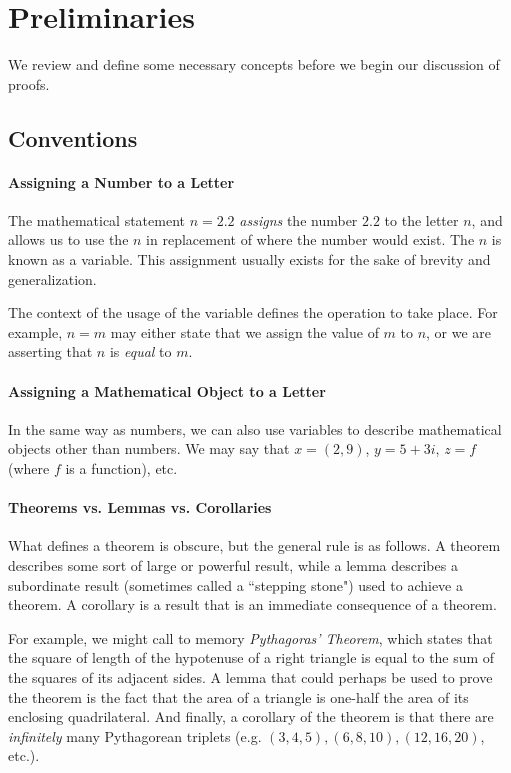 \documentclass[../proofs.tex]{subfiles}
\begin{document}
\chapter{Preliminaries}
We review and define some necessary concepts before we begin our discussion of proofs.
\section{Conventions}
  \subsubsection*{Assigning a Number to a Letter}
  The mathematical statement $n = 2.2$ \emph{assigns} the number $2.2$ to the letter $n$,
  and allows us to use the $n$ in replacement of where the number would exist.
  The $n$ is known as a variable. This assignment usually exists for the sake of
  brevity and generalization.

  The context of the usage of the variable defines the operation to take place.
  For example, $n = m$ may either state that we assign the value of $m$ to $n$, or
  we are asserting that $n$ is \emph{equal} to $m$.

  \subsubsection{Assigning a Mathematical Object to a Letter}
  In the same way as numbers, we can also use variables to describe mathematical
  objects other than numbers.
  We may say that $x = (2, 9)$, $y = 5 + 3i$, $z = f$ (where $f$ is a function), etc.

  \subsubsection*{Theorems vs. Lemmas vs. Corollaries}
  What defines a theorem is obscure, but the general rule is as follows.
  A theorem describes some sort of large or powerful result, while a lemma describes
  a subordinate result (sometimes called a ``stepping stone") used to achieve a
  theorem. A corollary is a result that is an immediate consequence of a theorem.

  For example, we might call to memory \emph{Pythagoras' Theorem}, which states
  that the square of length of the hypotenuse of a right triangle is equal to
  the sum of the squares of its adjacent sides. A lemma that could perhaps be used
  to prove the theorem is the fact that the area of a triangle is one-half the area
  of its enclosing quadrilateral. And finally, a corollary of the theorem is
  that there are \emph{infinitely} many Pythagorean triplets (e.g. $(3, 4, 5), (6, 8, 10), (12, 16, 20)$, etc.).
\end{document}
